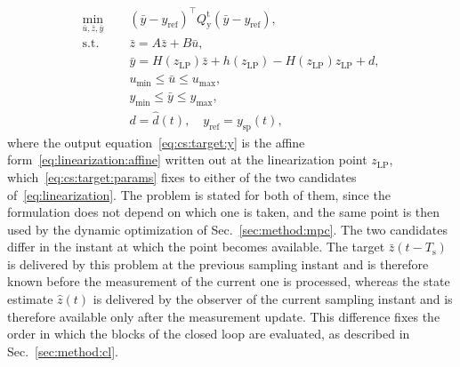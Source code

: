 \documentclass[preprint,12pt,authoryear]{elsarticle}
\theoremstyle{remark}
\newcommand{\ui}[2]{#1_{\text{#2}}}
\begin{document}
\begin{subequations}
  \label{eq:cs:target}
  \begin{align}
    \min_{\bar{u}, \bar{z}, \bar{y}} \quad & \; (\bar{y} - y_\text{ref})^\intercal \ui{Q}{y}^\text{t} (\bar{y} - y_\text{ref}), \label{eq:cs:target:obj} \\
    \text{s.t.} \quad & \; \bar{z} = A\bar{z} + B\bar{u}, \label{eq:cs:target:z} \\
    & \; \bar{y} = H(\ui{z}{LP})\bar{z} + h(\ui{z}{LP}) - H(\ui{z}{LP})\ui{z}{LP} + d, \label{eq:cs:target:y} \\
    & \; u_{\min} \leq \bar{u} \leq u_{\max}, \label{eq:cs:target:u} \\
    & \; y_{\min} \leq \bar{y} \leq y_{\max}, \label{eq:cs:target:ycon} \\
    & \; d = \hat{d}(t), \quad y_\text{ref} = y_\text{sp}(t), \label{eq:cs:target:params}%
  \end{align}
\end{subequations}
where the output equation~\eqref{eq:cs:target:y} is the affine form~\eqref{eq:linearization:affine} written out at the linearization point \(\ui{z}{LP}\), which~\eqref{eq:cs:target:params} fixes to either of the two candidates of~\eqref{eq:linearization}. The problem is stated for both of them, since the formulation does not depend on which one is taken, and the same point is then used by the dynamic optimization of Sec.~\ref{sec:method:mpc}. The two candidates differ in the instant at which the point becomes available. The target \(\bar{z}(t-T_\text{s})\) is delivered by this problem at the previous sampling instant and is therefore known before the measurement of the current one is processed, whereas the state estimate \(\hat{z}(t)\) is delivered by the observer of the current sampling instant and is therefore available only after the measurement update. This difference fixes the order in which the blocks of the closed loop are evaluated, as described in Sec.~\ref{sec:method:cl}.
\end{document}

